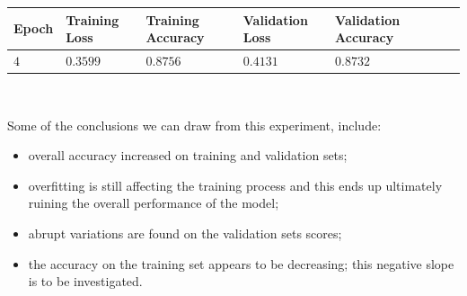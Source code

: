 \documentclass[11pt,a4paper]{article}
\begin{document}
\begin{center}
\begin{tabular}{|p{1.2cm}|p{1.8cm}|p{2cm}|p{2cm}|p{2cm}|p{2cm}|p{2cm}|}
\rowcolor{gray!50}
\hline
\textbf{Epoch} & \textbf{Training Loss} & \textbf{Training Accuracy} & \textbf{Validation Loss} & \textbf{Validation Accuracy}\\
\hline
$4$ & $0.3599$ & $0.8756$ & $0.4131$ & $0.8732$\\
\hline
\end{tabular}\\
\end{center}
Some of the conclusions we can draw from this experiment, include:
\begin{itemize}
    \item overall accuracy increased on training and validation sets;
    \item overfitting is still affecting the training process and this ends up ultimately ruining the overall performance of the model;
    \item abrupt variations are found on the validation sets scores;
    \item the accuracy on the training set appears to be decreasing; this negative slope is to be investigated.
\end{itemize}
\end{document}

